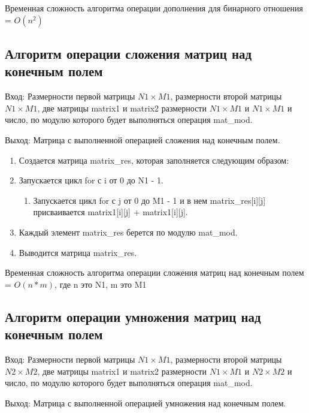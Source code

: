 \documentclass[bachelor, och, labwork]{shiza}
\begin{document}
	Временная сложность алгоритма операции дополнения для бинарного отношения = $O(n^2)$

	\subsection{Алгоритм операции сложения матриц над конечным полем}
	
			$\textit{Вход:}$ Размерности первой матрицы $N1 \times M1$, размерности второй матрицы $N1 \times M1$, две матрицы matrix1 и matrix2 размерности $N1 \times M1$ и $N1 \times M1$ и число, по модулю которого будет выполняться операция mat\_mod.

			$\textit{Выход:}$  Матрица с выполненной операцией сложения над конечным полем.		
	
	\begin{enumerate} 
		\item Создается матрица matrix\_res, которая заполняется следующим образом:
		\item Запускается цикл for с i от 0 до N1 - 1.
		\begin{enumerate} 
			\item Запускается цикл for с j от 0 до M1 - 1 и в нем   matrix\_res[i][j] присваивается matrix1[i][j] + matrix1[i][j].
		\end{enumerate}
		\item Каждый элемент matrix\_res берется по модулю mat\_mod.
		\item Выводится матрица matrix\_res.
	\end{enumerate} 
	
	Временная сложность алгоритма операции сложения матриц над конечным полем = $O(n * m)$, где n это N1, m это M1
	
	\subsection{Алгоритм операции умножения матриц над конечным полем}

			$\textit{Вход:}$ Размерности первой матрицы $N1 \times M1$, размерности второй матрицы $N2 \times M2$, две матрицы matrix1 и matrix2 размерности $N1 \times M1$ и $N2 \times M2$ и число, по модулю которого будет выполняться операция mat\_mod.

			$\textit{Выход:}$  Матрица с выполненной операцией умножения над конечным полем.	
\end{document}
